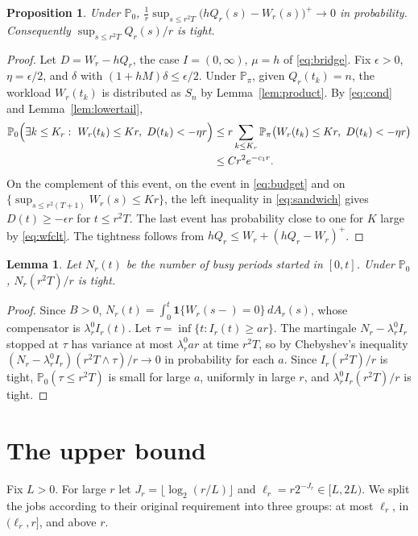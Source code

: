 \documentclass[11pt]{amsart}
\newtheorem{lemma}[theorem]{Lemma}
\newtheorem{proposition}[theorem]{Proposition}
\theoremstyle{remark}
\numberwithin{equation}{section}
\newcommand{\Pp}{\mathbb P}
\newcommand{\1}{\mathbf 1}
\begin{document}
\begin{proposition}\label{prop:lower}
Under $\Pp_0$, $\frac1r\sup_{s\le r^2T}\bigl(hQ_r(s)-W_r(s)\bigr)^+\to0$ in probability. Consequently $\sup_{s\le r^2T}Q_r(s)/r$ is tight.
\end{proposition}

\begin{proof}
Let $D=W_r-hQ_r$, the case $I=(0,\infty)$, $\mu=h$ of \eqref{eq:bridge}. Fix $\epsilon>0$, $\eta=\epsilon/2$, and $\delta$ with $(1+hM)\delta\le\epsilon/2$. Under $\Pp_\pi$, given $Q_r(t_k)=n$, the workload $W_r(t_k)$ is distributed as $S_n$ by Lemma~\ref{lem:product}. By \eqref{eq:cond} and Lemma~\ref{lem:lowertail},
\[
\begin{aligned}
\Pp_0\Bigl(\exists k\le K_r:\ W_r(t_k)\le Kr,\ D(t_k)<-\eta r\Bigr)&\le r\sum_{k\le K_r}\Pp_\pi\bigl(W_r(t_k)\le Kr,\ D(t_k)<-\eta r\bigr)\\
&\le Cr^2e^{-c_1r}.
\end{aligned}
\]
On the complement of this event, on the event in \eqref{eq:budget} and on $\{\sup_{s\le r^2(T+1)}W_r(s)\le Kr\}$, the left inequality in \eqref{eq:sandwich} gives $D(t)\ge-\epsilon r$ for $t\le r^2T$. The last event has probability close to one for $K$ large by \eqref{eq:wfclt}. The tightness follows from $hQ_r\le W_r+(hQ_r-W_r)^+$.
\end{proof}

\begin{lemma}\label{lem:ncycles}
Let $N_r(t)$ be the number of busy periods started in $[0,t]$. Under $\Pp_0$, $N_r(r^2T)/r$ is tight.
\end{lemma}

\begin{proof}
Since $B>0$, $N_r(t)=\int_0^t\1\{W_r(s-)=0\}\,dA_r(s)$, whose compensator is $\lambda^0_rI_r(t)$. Let $\tau=\inf\{t:I_r(t)\ge ar\}$. The martingale $N_r-\lambda_r^0I_r$ stopped at $\tau$ has variance at most $\lambda^0_rar$ at time $r^2T$, so by Chebyshev's inequality $(N_r-\lambda^0_rI_r)(r^2T\wedge\tau)/r\to0$ in probability for each $a$. Since $I_r(r^2T)/r$ is tight, $\Pp_0(\tau\le r^2T)$ is small for large $a$, uniformly in large $r$, and $\lambda_r^0I_r(r^2T)/r$ is tight.
\end{proof}

\section{The upper bound}\label{sec:upper}

Fix $L>0$. For large $r$ let $J_r=\lfloor\log_2(r/L)\rfloor$ and $\ell_r=r2^{-J_r}\in[L,2L)$. We split the jobs according to their original requirement into three groups: at most $\ell_r$, in $(\ell_r,r]$, and above $r$.
\end{document}
